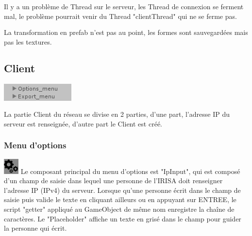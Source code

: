 \documentclass[a4paper,11pt]{article}
\begin{document}
			Il y a un problème de Thread sur le serveur, les Thread de connexion se ferment mal, le problème pourrait venir du Thread "clientThread" qui ne se ferme pas.
			
			La transformation en prefab n'est pas au point, les formes sont sauvegardées mais pas les textures.
		
	\subsection{Client}
	\includegraphics[scale=0.9]{./images/option_exp.png}
	
		La partie Client du réseau se divise en 2 parties, d'une part, l'adresse IP du serveur est renseignée, d'autre part le Client est créé.
		\subsubsection{Menu d'options}
		\includegraphics[scale=0.9]{./images/option.png} Le composant principal du menu d'options est "IpInput", qui est composé d'un champ de saisie dans lequel une personne de l'IRISA doit renseigner l'adresse IP (IPv4) du serveur. Lorsque qu'une personne écrit dans le champ de saisie puis valide le texte en cliquant ailleurs ou en appuyant sur ENTREE, le script "getter" appliqué au GameObject de même nom enregistre la chaîne de caractères.
			Le "Placeholder" affiche un texte en grisé dans le champ pour guider la personne qui écrit.
		
\end{document}
